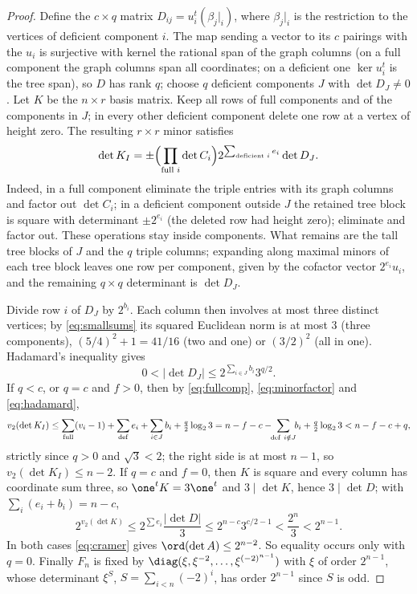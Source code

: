 \begin{proof}
Define the $c\times q$ matrix $D_{ij}=u_i^t(\beta_j|_i)$, where $\beta_j|_i$ is
the restriction to the vertices of deficient component $i$. The map sending a
vector to its $c$ pairings with the $u_i$ is surjective with kernel the
rational span of the graph columns (on a full component the graph columns span
all coordinates; on a deficient one $\ker u_i^t$ is the tree span), so $D$ has
rank $q$; choose $q$ deficient components $J$ with $\det D_J\ne0$. Let $K$ be
the $n\times r$ basis matrix. Keep all rows of full components and of the
components in $J$; in every other deficient component delete one row at a
vertex of height zero. The resulting $r\times r$ minor satisfies
\begin{equation}\label{eq:minorfactor}
 \det K_I=\pm\Bigl(\prod_{\text{full }i}\det C_i\Bigr)
 2^{\sum_{\text{deficient }i}e_i}\det D_J .
\end{equation}
Indeed, in a full component eliminate the triple entries with its graph
columns and factor out $\det C_i$; in a deficient component outside $J$ the
retained tree block is square with determinant $\pm2^{e_i}$ (the deleted row
had height zero); eliminate and factor out. These operations stay inside
components. What remains are the tall tree blocks of $J$ and the $q$ triple
columns; expanding along maximal minors of each tree block leaves one row per
component, given by the cofactor vector $2^{e_i}u_i$, and the remaining
$q\times q$ determinant is $\det D_J$.

Divide row $i$ of $D_J$ by $2^{b_i}$. Each column then involves at most three
distinct vertices; by \eqref{eq:smallsums} its squared Euclidean norm is at
most $3$ (three components), $(5/4)^2+1=41/16$ (two and one) or $(3/2)^2$ (all
in one). Hadamard's inequality gives
\begin{equation}\label{eq:hadamard}
 0<|\det D_J|\le2^{\sum_{i\in J}b_i}3^{q/2} .
\end{equation}
If $q<c$, or $q=c$ and $f>0$, then by \eqref{eq:fullcomp},
\eqref{eq:minorfactor} and \eqref{eq:hadamard},
\[
 v_2(\det K_I)\le\sum_{\rm full}(v_i-1)+\sum_{\rm def}e_i+\sum_{i\in J}b_i
 +\tfrac q2\log_23
 =n-f-c-\!\!\sum_{\substack{{\rm def}\ i\notin J}}\!\!b_i+\tfrac q2\log_23<n-f-c+q,
\]
strictly since $q>0$ and $\sqrt3<2$; the right side is at most $n-1$, so
$v_2(\det K_I)\le n-2$. If $q=c$ and $f=0$, then $K$ is square and every
column has coordinate sum three, so $\one^tK=3\one^t$ and $3\mid\det K$, hence
$3\mid\det D$; with $\sum_i(e_i+b_i)=n-c$,
\[
 2^{v_2(\det K)}\le2^{\sum e_i}\frac{|\det D|}3\le2^{n-c}3^{c/2-1}<\frac{2^n}3
 <2^{n-1}.
\]
In both cases \eqref{eq:cramer} gives $\ord(\det A)\le2^{n-2}$. So equality
occurs only with $q=0$. Finally $F_n$ is fixed by
$\diag(\xi,\xi^{-2},\dots,\xi^{(-2)^{n-1}})$ with $\xi$ of order $2^{n-1}$,
whose determinant $\xi^{S}$, $S=\sum_{i<n}(-2)^i$, has order $2^{n-1}$ since
$S$ is odd.
\end{proof}


